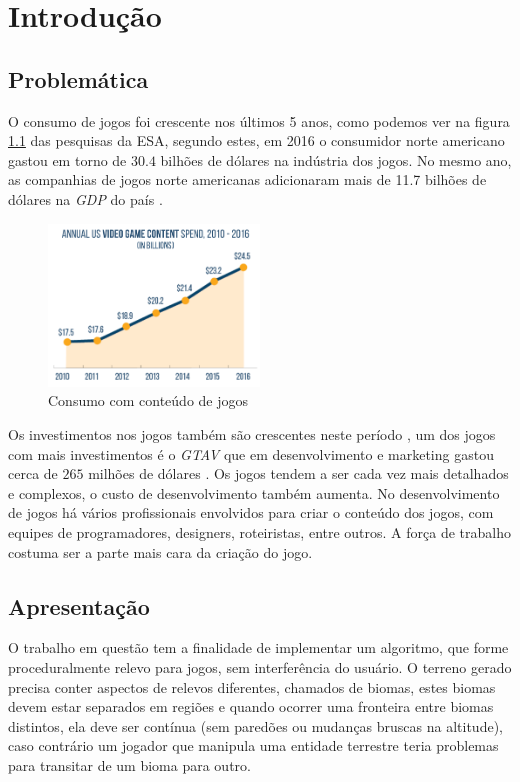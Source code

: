 
\chapter{Introdução}

\section{Problemática}
O consumo de jogos foi crescente nos últimos 5 anos, como podemos ver na figura
\ref{fig:esa_graph_2017} das pesquisas da ESA,
segundo estes, em 2016 o consumidor norte americano gastou em torno de $30.4$
bilhões de dólares na indústria dos jogos. No mesmo ano, as companhias de jogos
norte americanas adicionaram mais de 11.7 bilhões de dólares na \textit{GDP}
do país \cite{entertainment2017essential}.
\begin{figure}[H]
    \centering
    \includegraphics[width=0.5\textwidth]{figuras/ESAGraph2017.png}
    \caption{Consumo com conteúdo de jogos\cite{entertainment2017essential}}
    \label{fig:esa_graph_2017}
\end{figure}

Os investimentos nos jogos também são crescentes neste
período \cite{entertainment2017essential}, um dos jogos com mais investimentos é
o \textit{GTAV} que em desenvolvimento e marketing gastou cerca de $265$
milhões de dólares \cite{villapaz2013gta}. Os jogos tendem a ser cada vez mais
detalhados e complexos, o custo de desenvolvimento também aumenta.
No desenvolvimento de jogos há vários profissionais envolvidos para criar
o conteúdo dos jogos, com equipes de programadores, designers,  roteiristas,
entre outros. A força de trabalho costuma ser a parte mais cara da
criação do jogo.

\section{Apresentação}
O trabalho em questão tem a finalidade de implementar um algoritmo,
que forme proceduralmente relevo para jogos, sem 
interferência do usuário.
O terreno gerado precisa conter aspectos de relevos diferentes, chamados de biomas,
estes biomas devem estar separados em regiões e quando ocorrer uma fronteira
entre biomas distintos, ela deve ser contínua (sem paredões ou mudanças bruscas na altitude),
caso contrário um jogador que manipula uma entidade terrestre teria problemas para 
transitar de um bioma para outro.

